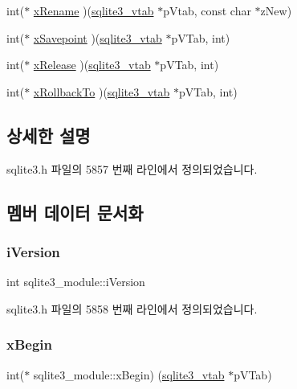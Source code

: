 \begin{DoxyCompactItemize}
\item 
int($\ast$ \hyperlink{structsqlite3__module_a684849a921202d5dec6012824c1d2308}{x\+Rename} )(\hyperlink{structsqlite3__vtab}{sqlite3\+\_\+vtab} $\ast$p\+Vtab, const char $\ast$z\+New)
\item 
int($\ast$ \hyperlink{structsqlite3__module_a3819f1935503e558637647c359193ef9}{x\+Savepoint} )(\hyperlink{structsqlite3__vtab}{sqlite3\+\_\+vtab} $\ast$p\+V\+Tab, int)
\item 
int($\ast$ \hyperlink{structsqlite3__module_ac5f0d86a3e9a26668dbf1251a7c51517}{x\+Release} )(\hyperlink{structsqlite3__vtab}{sqlite3\+\_\+vtab} $\ast$p\+V\+Tab, int)
\item 
int($\ast$ \hyperlink{structsqlite3__module_aaf96452ff3240596b8b8850c2baff3eb}{x\+Rollback\+To} )(\hyperlink{structsqlite3__vtab}{sqlite3\+\_\+vtab} $\ast$p\+V\+Tab, int)
\end{DoxyCompactItemize}


\subsection{상세한 설명}


sqlite3.\+h 파일의 5857 번째 라인에서 정의되었습니다.



\subsection{멤버 데이터 문서화}
\mbox{\label{structsqlite3__module_a42b11d080dc205aea43581b18f925afe}} 
\subsubsection{\texorpdfstring{i\+Version}{iVersion}}
{\footnotesize\ttfamily int sqlite3\+\_\+module\+::i\+Version}



sqlite3.\+h 파일의 5858 번째 라인에서 정의되었습니다.

\mbox{\label{structsqlite3__module_af190bd5cbd1e3ff30a09ca7b015af1a1}} 
\subsubsection{\texorpdfstring{x\+Begin}{xBegin}}
{\footnotesize\ttfamily int($\ast$ sqlite3\+\_\+module\+::x\+Begin) (\hyperlink{structsqlite3__vtab}{sqlite3\+\_\+vtab} $\ast$p\+V\+Tab)}



